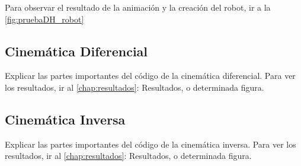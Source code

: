 Para observar el resultado de la animación y la creación del robot, ir a la \autoref{fig:pruebaDH_robot}

\subsection{Cinemática Diferencial}
Explicar las partes importantes del código de la cinemática diferencial.
Para ver los resultados, ir al \autoref{chap:resultados}: Resultados, o determinada figura.

\subsection{Cinemática Inversa}
Explicar las partes importantes del código de la cinemática inversa.
Para ver los resultados, ir al \autoref{chap:resultados}: Resultados, o determinada figura.

